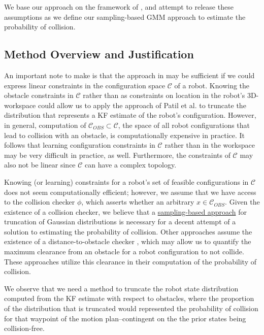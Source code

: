 \documentclass[journal]{IEEEtran}
\begin{document}
We base our approach on the framework of \cite{IEEEhowto:patil}, and attempt to release these assumptions as we define our sampling-based GMM approach to estimate the probability of collision.

\subsection{Method Overview and Justification}

An important note to make is that the approach in \cite{IEEEhowto:patil} may be sufficient if we could express linear constraints in the configuration space $\mathcal{C}$ of a robot. Knowing the obstacle constraints in  $\mathcal{C}$ rather than as constraints on location in the robot's 3D-workspace could allow us to apply the approach of Patil et al. to truncate the distribution that represents a KF estimate of the robot's configuration. However, in general, computation of $\mathcal{C}_{OBS} \subset \mathcal{C}$, the space of all robot configurations that lead to collision with an obstacle, is computationally expensive in practice. It follows that learning configuration constraints in $\mathcal{C}$ rather than in the workspace may be very difficult in practice, as well. Furthermore, the constraints of $\mathcal{C}$ may also not be linear since $\mathcal{C}$ can have a complex topology.

Knowing (or learning) constraints for a robot's set of feasible configurations in $\mathcal{C}$ does not seem computationally efficient; however, we assume that we have access to the collision checker $\phi$, which asserts whether an arbitrary $x \in \mathcal{C}_{OBS}$. Given the existence of a collision checker, we believe that a \underline{sampling-based approach} for truncation of Gaussian distributions is necessary for a decent attempt of a solution to estimating the probability of collision. Other approaches assume the existence of a distance-to-obstacle checker \cite{IEEEhowto:van_den_berg}, which may allow us to quantify the maximum clearance from an obstacle for a robot configuration to not collide. These approaches utilize this clearance in their computation of the probability of collision.

We observe that we need a method to truncate the robot state distribution computed from the KF estimate with respect to obstacles, where the proportion of the distribution that is truncated would represented the probability of collision for that waypoint of the motion plan--contingent on the the prior states being collision-free.
\end{document}
